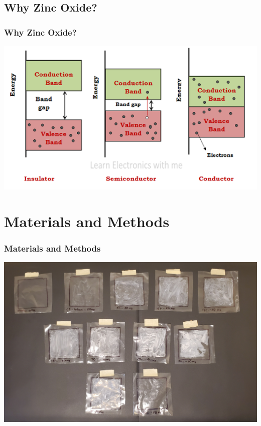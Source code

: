 \documentclass[10pt,aspectratio=169]{beamer} %
\begin{document}
\subsection{Why Zinc Oxide?}
\begin{frame}\centering
  \frametitle{Why Zinc Oxide?}
  \includegraphics[scale = 0.5]{bandgap.png}
\end{frame}

\section{Materials and Methods}
\begin{frame}\centering
  \frametitle{Materials and Methods}
  \includegraphics[scale = 0.1]{Sunscreens.jpg}
\end{frame}
\end{document}
